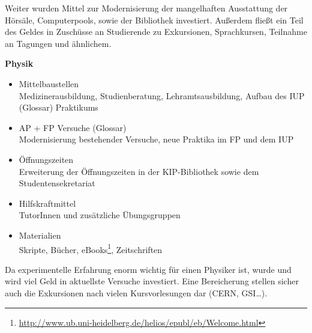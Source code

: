 Weiter wurden Mittel zur Modernisierung der mangelhaften Ausstattung der Hörsäle,
Computerpools, sowie der Bibliothek investiert. Außerdem fließt ein Teil des Geldes
in Zuschüsse an Studierende zu Exkursionen, Sprachkursen, Teilnahme an Tagungen und
ähnlichem.

\vspace{5mm}
\textbf{Physik}
\begin{itemize}
\item {Mittelbaustellen}\\Medizinerausbildung, Studienberatung, Lehramtsausbildung, Aufbau des IUP (Glossar) Praktikums
\item {AP + FP Versuche (Glossar)}\\Modernisierung bestehender Versuche, neue
Praktika im FP und dem IUP
\item {Öffnungszeiten}\\Erweiterung der Öffnungszeiten in der \gls{KIP}-Bibliothek sowie dem Studentensekretariat
\item {Hilfskraftmittel}\\ TutorInnen und zusätzliche Übungsgruppen
\item {Materialien}\\Skripte, Bücher, eBooks\footnote{\url{http://www.ub.uni-heidelberg.de/helios/epubl/eb/Welcome.html}}, Zeitschriften
\end{itemize}

Da experimentelle Erfahrung enorm wichtig für einen Physiker ist, wurde und wird
viel Geld in aktuellste Versuche investiert. Eine Bereicherung stellen sicher auch
die Exkursionen nach vielen Kursvorlesungen dar (CERN, GSI\dots).


\vfill
\begin{figure}[h]
\end{figure}
\vfill
